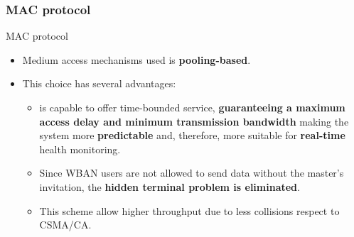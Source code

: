 \documentclass[10pt]{beamer}
\begin{document}
\subsubsection{MAC protocol}
\begin{frame}{MAC protocol} 

\begin{itemize}

\item Medium access mechanisms used is \textbf{pooling-based}.

\item This choice has several advantages:

\begin{itemize}

\item is capable to offer time-bounded service, \textbf{guaranteeing a maximum access delay and minimum transmission bandwidth} making the system more \textbf{predictable} and, therefore, more suitable for \textbf{real-time} health monitoring.

\item Since WBAN users are not allowed to send data without the master's invitation, the \textbf{hidden terminal problem is eliminated}.

\item This scheme allow higher throughput due to less collisions respect to CSMA/CA.\cite{schiller2003mobile}

\end{itemize}

\end{itemize}

\end{frame} 
\end{document}
